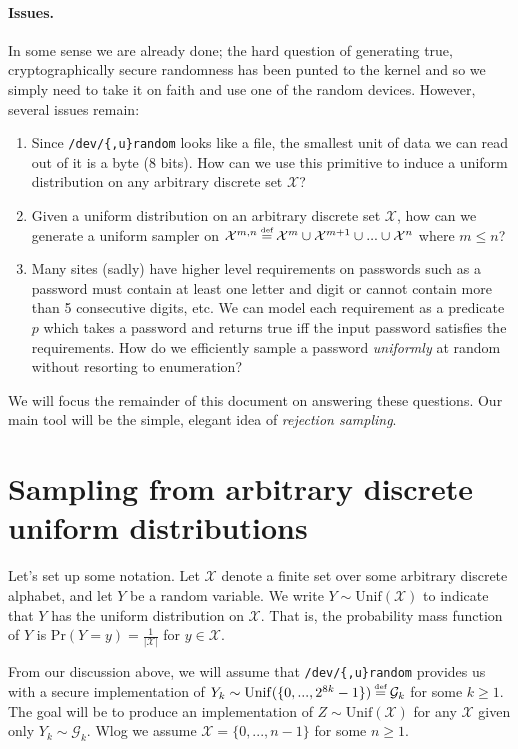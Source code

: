 \documentclass[10pt]{article}
\newcommand{\X}{\mathcal{X}}
\newcommand{\G}{\mathcal{G}}
\newcommand{\abs}[1]{\left| #1 \right|}
\newcommand{\Unif}{\mathrm{Unif}}
\renewcommand{\Pr}{\mathrm{Pr}}
\newcommand\defeq{\stackrel{\mathclap{\normalfont\tiny\mbox{def}}}{=}}
\begin{document}
\paragraph{Issues.} In some sense we are already done; the hard question of generating true,
cryptographically secure randomness has been punted to the kernel and so we
simply need to take it on faith and use one of the random devices. However, several
issues remain:
\begin{enumerate}
  \item Since \verb|/dev/{,u}random| looks like a file, the smallest unit of data
    we can read out of it is a byte (8 bits). How can we use this primitive to induce
    a uniform distribution on any arbitrary discrete set $\X$?
  \item Given a uniform distribution on an arbitrary discrete set $\X$, how can
    we generate a uniform sampler on $\X^{m,n} \defeq \X^m \cup \X^{m+1} \cup ... \cup \X^{n}$ 
    where $m \leq n$?
  \item Many sites (sadly) have higher level requirements on passwords such as 
    a password must contain at least one letter and digit or cannot contain
    more than 5 consecutive digits, etc. We can model each
    requirement as a predicate $p$ which takes a password and returns true iff
    the input password satisfies the requirements. How do we efficiently sample
    a password \emph{uniformly} at random without resorting to enumeration?
\end{enumerate}
We will focus the remainder of this document on answering these questions.
Our main tool will be the simple, elegant idea of \emph{rejection sampling}. 

\section{Sampling from arbitrary discrete uniform distributions}
\label{sec:unif}
Let's set up some notation. Let $\X$ denote a finite set over some arbitrary
discrete alphabet, and let $Y$ be a random variable. We write $Y \sim
\Unif(\X)$ to indicate that $Y$ has the uniform distribution on $\X$.  That is,
the probability mass function of $Y$ is $\Pr(Y=y) = \frac{1}{\abs{\X}}$ for $y \in \X$.

From our discussion above, we will assume that \verb|/dev/{,u}random| provides
us with a secure implementation of $Y_k \sim \Unif(\{0, ..., 2^{8k} - 1\}) \defeq \G_k$ for some $k \geq 1$.
%
The goal will be to produce an implementation of $Z \sim \Unif(\X)$ for any
$\X$ given only $Y_k \sim \G_k$. Wlog we assume $\X = \{0, ..., n-1\}$ for some $n
\geq 1$.
\end{document}
